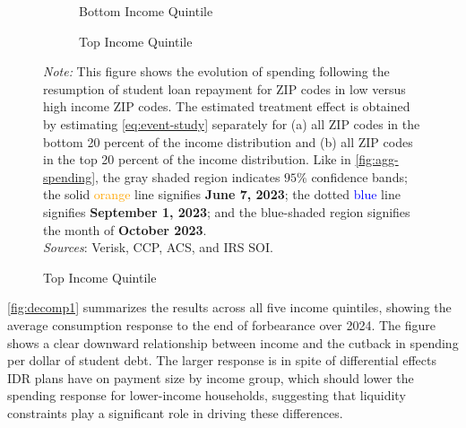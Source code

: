 \documentclass[12pt]{article}
\begin{document}
\begin{figure}[!ht]
    \centering
    \caption{Spending Response by Income Quintiles}
    \label{fig:income-results}
    
    \begin{subfigure}{0.495\textwidth}
        \centering
		\resizebox{\linewidth}{!}{
			
			}
		\caption{Bottom Income Quintile}
        \label{fig:lowincome-spending}
    \end{subfigure}
    \begin{subfigure}{0.495\textwidth}
        \centering
        \resizebox{\linewidth}{!}{
			
			}
		\caption{Top Income Quintile} 
        \label{fig:high-income-spending}
    \end{subfigure}

    \raggedright     \footnotesize{
    \emph{Note:} This figure shows the evolution of spending following the resumption of student loan repayment for ZIP codes in low versus high income ZIP codes. The estimated treatment effect is obtained by estimating \cref{eq:event-study} separately for (a) all ZIP codes in the bottom 20 percent of the income distribution and (b) all ZIP codes in the top 20 percent of the income distribution. Like in \cref{fig:agg-spending}, the gray shaded region indicates $95\%$ confidence bands; the solid \textcolor{orange}{orange} line signifies \textbf{June 7, 2023}; the dotted \textcolor{blue}{blue} line signifies \textbf{September 1, 2023}; and the blue-shaded region signifies the month of \textbf{October 2023}.
	\\
	\textit{Sources}: Verisk, CCP, ACS, and IRS SOI.
	}
\end{figure}

\cref{fig:decomp1} summarizes the results across all five income quintiles, showing the average consumption response to the end of forbearance over 2024. The figure shows a clear downward relationship between income and the cutback in spending per dollar of student debt. The larger response is in spite of differential effects IDR plans have on payment size by income group, which should lower the spending response for lower-income households, suggesting that liquidity constraints play a significant role in driving these differences.
\end{document}
